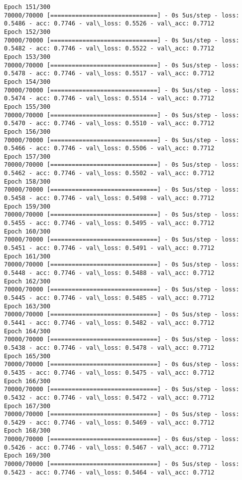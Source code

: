 \documentclass[11pt]{article}
\begin{document}
\begin{Verbatim}[commandchars=\\\{\}]
Epoch 151/300
70000/70000 [==============================] - 0s 5us/step - loss: 0.5486 - acc: 0.7746 - val\_loss: 0.5526 - val\_acc: 0.7712
Epoch 152/300
70000/70000 [==============================] - 0s 5us/step - loss: 0.5482 - acc: 0.7746 - val\_loss: 0.5522 - val\_acc: 0.7712
Epoch 153/300
70000/70000 [==============================] - 0s 5us/step - loss: 0.5478 - acc: 0.7746 - val\_loss: 0.5517 - val\_acc: 0.7712
Epoch 154/300
70000/70000 [==============================] - 0s 5us/step - loss: 0.5474 - acc: 0.7746 - val\_loss: 0.5514 - val\_acc: 0.7712
Epoch 155/300
70000/70000 [==============================] - 0s 5us/step - loss: 0.5470 - acc: 0.7746 - val\_loss: 0.5510 - val\_acc: 0.7712
Epoch 156/300
70000/70000 [==============================] - 0s 5us/step - loss: 0.5466 - acc: 0.7746 - val\_loss: 0.5506 - val\_acc: 0.7712
Epoch 157/300
70000/70000 [==============================] - 0s 5us/step - loss: 0.5462 - acc: 0.7746 - val\_loss: 0.5502 - val\_acc: 0.7712
Epoch 158/300
70000/70000 [==============================] - 0s 5us/step - loss: 0.5458 - acc: 0.7746 - val\_loss: 0.5498 - val\_acc: 0.7712
Epoch 159/300
70000/70000 [==============================] - 0s 5us/step - loss: 0.5455 - acc: 0.7746 - val\_loss: 0.5495 - val\_acc: 0.7712
Epoch 160/300
70000/70000 [==============================] - 0s 5us/step - loss: 0.5451 - acc: 0.7746 - val\_loss: 0.5491 - val\_acc: 0.7712
Epoch 161/300
70000/70000 [==============================] - 0s 5us/step - loss: 0.5448 - acc: 0.7746 - val\_loss: 0.5488 - val\_acc: 0.7712
Epoch 162/300
70000/70000 [==============================] - 0s 5us/step - loss: 0.5445 - acc: 0.7746 - val\_loss: 0.5485 - val\_acc: 0.7712
Epoch 163/300
70000/70000 [==============================] - 0s 5us/step - loss: 0.5441 - acc: 0.7746 - val\_loss: 0.5482 - val\_acc: 0.7712
Epoch 164/300
70000/70000 [==============================] - 0s 5us/step - loss: 0.5438 - acc: 0.7746 - val\_loss: 0.5478 - val\_acc: 0.7712
Epoch 165/300
70000/70000 [==============================] - 0s 6us/step - loss: 0.5435 - acc: 0.7746 - val\_loss: 0.5475 - val\_acc: 0.7712
Epoch 166/300
70000/70000 [==============================] - 0s 5us/step - loss: 0.5432 - acc: 0.7746 - val\_loss: 0.5472 - val\_acc: 0.7712
Epoch 167/300
70000/70000 [==============================] - 0s 5us/step - loss: 0.5429 - acc: 0.7746 - val\_loss: 0.5469 - val\_acc: 0.7712
Epoch 168/300
70000/70000 [==============================] - 0s 6us/step - loss: 0.5426 - acc: 0.7746 - val\_loss: 0.5467 - val\_acc: 0.7712
Epoch 169/300
70000/70000 [==============================] - 0s 5us/step - loss: 0.5423 - acc: 0.7746 - val\_loss: 0.5464 - val\_acc: 0.7712

\end{Verbatim}
\end{document}
